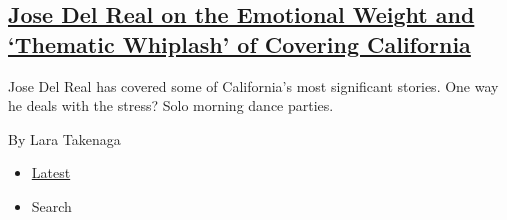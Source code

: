 \begin{enumerate}
{  \subsection{\texorpdfstring{\href{/2019/03/23/reader-center/jose-del-real-national-correspondent-california.html}{Jose
  Del Real on the Emotional Weight and `Thematic Whiplash' of Covering
  California}}{Jose Del Real on the Emotional Weight and `Thematic Whiplash' of Covering California}}\label{jose-del-real-on-the-emotional-weight-and-thematic-whiplash-of-covering-california}}

  Jose Del Real has covered some of California's most significant
  stories. One way he deals with the stress? Solo morning dance parties.

  By Lara Takenaga
\end{enumerate}

\begin{itemize}
\tightlist
\item
  \protect\hyperlink{stream-panel}{Latest}
\item
  Search
\end{itemize}

